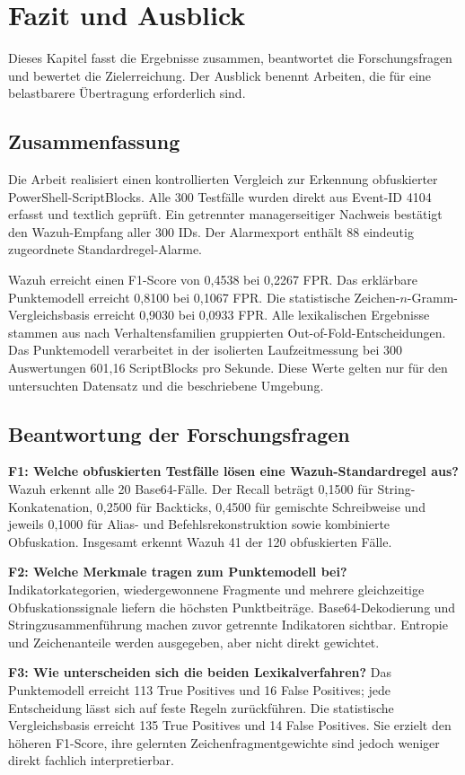 \documentclass[12pt,a4paper,oneside,parskip=half]{scrreprt}
\begin{document}
\chapter{Fazit und Ausblick}

Dieses Kapitel fasst die Ergebnisse zusammen, beantwortet die Forschungsfragen und bewertet die Zielerreichung. Der Ausblick benennt Arbeiten, die für eine belastbarere Übertragung erforderlich sind.

\section{Zusammenfassung}
Die Arbeit realisiert einen kontrollierten Vergleich zur Erkennung obfuskierter PowerShell-ScriptBlocks. Alle 300 Testfälle wurden direkt aus Event-ID 4104 erfasst und textlich geprüft. Ein getrennter managerseitiger Nachweis bestätigt den Wazuh-Empfang aller 300 IDs. Der Alarmexport enthält 88 eindeutig zugeordnete Standardregel-Alarme.

Wazuh erreicht einen F1-Score von 0{,}4538 bei 0{,}2267 FPR. Das erklärbare Punktemodell erreicht 0{,}8100 bei 0{,}1067 FPR. Die statistische Zeichen-\(n\)-Gramm-Vergleichsbasis erreicht 0{,}9030 bei 0{,}0933 FPR. Alle lexikalischen Ergebnisse stammen aus nach Verhaltensfamilien gruppierten Out-of-Fold-Entscheidungen. Das Punktemodell verarbeitet in der isolierten Laufzeitmessung bei 300 Auswertungen 601{,}16 ScriptBlocks pro Sekunde. Diese Werte gelten nur für den untersuchten Datensatz und die beschriebene Umgebung.
\section{Beantwortung der Forschungsfragen}
\textbf{F1: Welche obfuskierten Testfälle lösen eine Wazuh-Standardregel aus?} Wazuh erkennt alle 20 Base64-Fälle. Der Recall beträgt 0{,}1500 für String-Konkatenation, 0{,}2500 für Backticks, 0{,}4500 für gemischte Schreibweise und jeweils 0{,}1000 für Alias- und Befehlsrekonstruktion sowie kombinierte Obfuskation. Insgesamt erkennt Wazuh 41 der 120 obfuskierten Fälle.

\textbf{F2: Welche Merkmale tragen zum Punktemodell bei?} Indikatorkategorien, wiedergewonnene Fragmente und mehrere gleichzeitige Obfuskationssignale liefern die höchsten Punktbeiträge. Base64-Dekodierung und Stringzusammenführung machen zuvor getrennte Indikatoren sichtbar. Entropie und Zeichenanteile werden ausgegeben, aber nicht direkt gewichtet.

\textbf{F3: Wie unterscheiden sich die beiden Lexikalverfahren?} Das Punktemodell erreicht 113 True Positives und 16 False Positives; jede Entscheidung lässt sich auf feste Regeln zurückführen. Die statistische Vergleichsbasis erreicht 135 True Positives und 14 False Positives. Sie erzielt den höheren F1-Score, ihre gelernten Zeichenfragmentgewichte sind jedoch weniger direkt fachlich interpretierbar.
\end{document}
